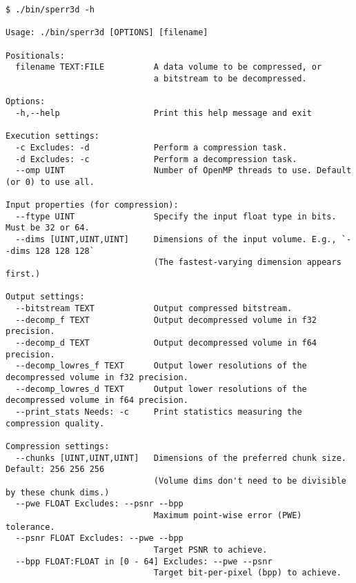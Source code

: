 \documentclass{article}
\begin{document}
\begin{verbatim}
$ ./bin/sperr3d -h

Usage: ./bin/sperr3d [OPTIONS] [filename]

Positionals:
  filename TEXT:FILE          A data volume to be compressed, or
                              a bitstream to be decompressed.

Options:
  -h,--help                   Print this help message and exit

Execution settings:
  -c Excludes: -d             Perform a compression task.
  -d Excludes: -c             Perform a decompression task.
  --omp UINT                  Number of OpenMP threads to use. Default (or 0) to use all.

Input properties (for compression):
  --ftype UINT                Specify the input float type in bits. Must be 32 or 64.
  --dims [UINT,UINT,UINT]     Dimensions of the input volume. E.g., `--dims 128 128 128`
                              (The fastest-varying dimension appears first.)

Output settings:
  --bitstream TEXT            Output compressed bitstream.
  --decomp_f TEXT             Output decompressed volume in f32 precision.
  --decomp_d TEXT             Output decompressed volume in f64 precision.
  --decomp_lowres_f TEXT      Output lower resolutions of the decompressed volume in f32 precision.
  --decomp_lowres_d TEXT      Output lower resolutions of the decompressed volume in f64 precision.
  --print_stats Needs: -c     Print statistics measuring the compression quality.

Compression settings:
  --chunks [UINT,UINT,UINT]   Dimensions of the preferred chunk size. Default: 256 256 256
                              (Volume dims don't need to be divisible by these chunk dims.)
  --pwe FLOAT Excludes: --psnr --bpp
                              Maximum point-wise error (PWE) tolerance.
  --psnr FLOAT Excludes: --pwe --bpp
                              Target PSNR to achieve.
  --bpp FLOAT:FLOAT in [0 - 64] Excludes: --pwe --psnr
                              Target bit-per-pixel (bpp) to achieve.
\end{verbatim}
\end{document}
